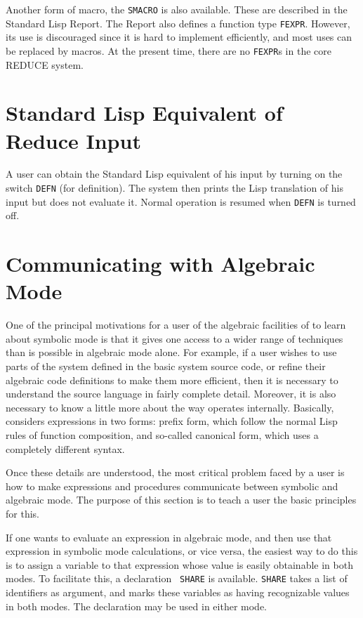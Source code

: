 \hypertarget{reserved:SMACRO}{}
\hypertarget{reserved:FEXPR}{}
Another form of macro, the {\tt SMACRO} is also available.
These are described in the Standard Lisp Report.  The Report also defines
a function type {\tt FEXPR}.
However, its use is discouraged since it is hard to implement efficiently,
and most uses can be replaced by macros.  At the present time, there are
no {\tt FEXPR}s in the core REDUCE system.

\section{Standard Lisp Equivalent of Reduce Input}
\hypertarget{switch:DEFN}{}

A user can obtain the Standard Lisp equivalent of his {\REDUCE} input by
turning on the switch {\tt DEFN} (for definition).  The
system then prints the Lisp translation of his input but does not evaluate
it.  Normal operation is resumed when {\tt DEFN} is turned off.

\section{Communicating with Algebraic Mode}
\hypertarget{command:SHARE}{}

One of the principal motivations for a user of the algebraic facilities of
{\REDUCE} to learn about symbolic mode is that it
gives one access to a wider range of techniques than is possible in
algebraic mode alone.  For example, if a user
wishes to use parts of the system defined in the basic system source code,
or refine their algebraic code definitions to make them more efficient,
then it is necessary to understand the source language in fairly complete
detail.  Moreover, it is also necessary to know a little more about the
way {\REDUCE} operates internally.  Basically, {\REDUCE} considers
expressions in two forms: prefix form, which follow the normal Lisp rules
of function composition, and so-called canonical form, which uses a
completely different syntax.

Once these details are understood, the most critical problem faced by a
user is how to make expressions and procedures communicate between symbolic
and algebraic mode. The purpose of this section is to teach a user the
basic principles for this.

If one wants to evaluate an expression in algebraic mode, and then use
that expression in symbolic mode calculations, or vice versa, the easiest
way to do this is to assign a variable to that expression whose value is
easily obtainable in both modes.  To facilitate this, a declaration {\tt
SHARE} is available. {\tt SHARE} takes a list of
identifiers as argument, and marks these variables as having recognizable
values in both modes.  The declaration may be used in either mode.

